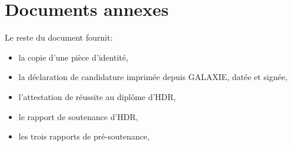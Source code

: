 \documentclass[11pt]{article}
\begin{document}
%



\newpage
\section{Documents annexes}

Le reste du document fournit:\\
\begin{itemize}
\item la copie d'une pièce d'identité,
\item la déclaration de candidature imprimée depuis GALAXIE, datée et signée,
\item l'attestation de réussite au diplôme d'HDR,
\item le rapport de soutenance d'HDR,
\item les trois rapports de pré-soutenance,
\end{itemize}
\end{document}
